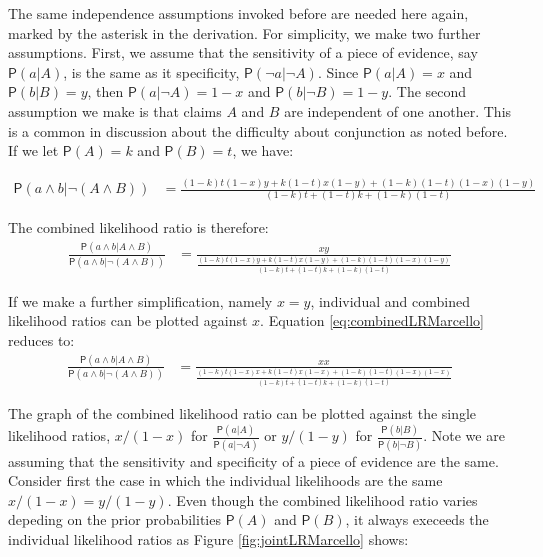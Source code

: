 \documentclass[10pt,dvipsnames,enabledeprecatedfontcommands]{scrartcl}
\newcommand{\et}{\wedge}
\newcommand{\pr}[1]{\mathsf{P}(#1)}
\begin{document}
\noindent  The same independence assumptions invoked before are needed
here
again,
marked by the asterisk in the derivation. For simplicity, we make two
further assumptions. First, we assume that the sensitivity of a piece of
evidence, say \(\pr{a |A}\), is the same as it specificity,
\(\pr{\neg a | \neg A}\). Since \(\pr{a |A}=x\) and \(\pr{b |B}=y\),
then \(\pr{a |\neg A}=1-x\) and \(\pr{b | \neg B}=1-y\). The second
assumption we make is that claims \(A\) and \(B\) are independent of one
another. This is a common in discussion about the difficulty about
conjunction as noted before. If we let \(\pr{A}=k\) and \(\pr{B}=t\), we
have:

\begin{align*}
\pr{a \et b| \neg (A\et B)} & = \frac{(1-k)t(1-x)y + k(1-t)x(1-y) + (1-k)(1-t)(1-x)(1-y)}{ \left(1-k\right) t +\left(1-t\right) k+\left(1-k\right) \left(1-t\right) }
 \end{align*}

\noindent The combined likelihood ratio is therefore:
\begin{align}\label{eq:combinedLRMarcello}
\frac{\pr{ a \et b |A \et B}}{\pr{a \et b | \neg (A \et B)}} & = \frac{xy}{\frac{(1-k)t(1-x)y + k(1-t)x(1-y) + (1-k)(1-t)(1-x)(1-y)}{ \left(1-k\right) t +\left(1-t\right) k+\left(1-k\right) \left(1-t\right) }}
 \end{align}

\noindent If we make a further simplification, namely \(x=y\),
individual and combined likelihood ratios can be plotted against \(x\).
Equation \eqref{eq:combinedLRMarcello} reduces to: \begin{align*}
\frac{\pr{ a \et b |A \et B}}{\pr{a \et b | \neg (A \et B)}} & = \frac{xx}{\frac{(1-k)t(1-x)x + k(1-t)x(1-x) + (1-k)(1-t)(1-x)(1-x)}{ \left(1-k\right) t +\left(1-t\right) k+\left(1-k\right) \left(1-t\right) }}
 \end{align*}

The graph of the combined likelihood ratio can be plotted against the
single likelihood ratios, \(x/(1-x)\) for
\(\frac{\pr{a |A}}{\pr{a | \neg A}}\) or \(y/(1-y)\) for
\(\frac{\pr{b |B}}{\pr{b | \neg B}}\). Note we are assuming that the
sensitivity and specificity of a piece of evidence are the same.
Consider first the case in which the individual likelihoods are the same
\(x/(1-x)=y/(1-y)\). Even though the combined likelihood ratio varies
depeding on the prior probabilities \(\pr{A}\) and \(\pr{B}\), it always
execeeds the individual likelihood ratios as Figure
\ref{fig:jointLRMarcello} shows:
\end{document}
